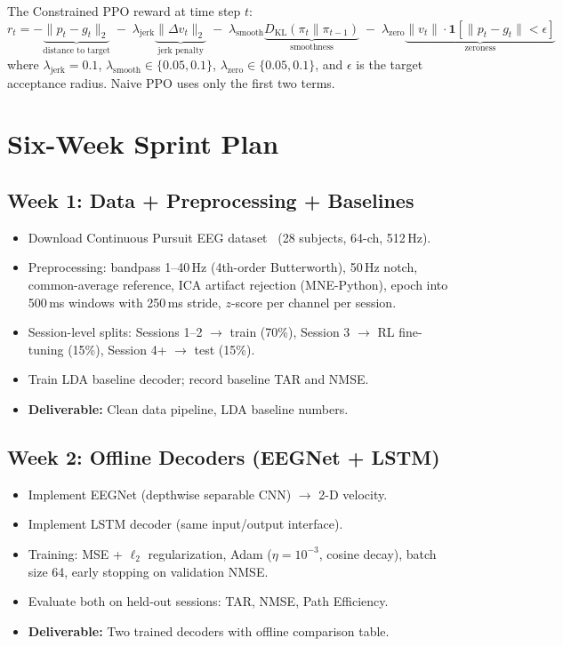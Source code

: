 \documentclass[11pt]{article}
\begin{document}
The Constrained PPO reward at time step $t$:
\begin{equation}
r_t = -\underbrace{\|p_t - g_t\|_2}_{\text{distance to target}}
      \;-\; \lambda_{\text{jerk}}\underbrace{\|\Delta v_t\|_2}_{\text{jerk penalty}}
      \;-\; \lambda_{\text{smooth}}\underbrace{D_{\mathrm{KL}}(\pi_t \| \pi_{t-1})}_{\text{smoothness}}
      \;-\; \lambda_{\text{zero}}\underbrace{\|v_t\| \cdot \mathbf{1}[\|p_t - g_t\| < \epsilon]}_{\text{zeroness}}
\end{equation}
where $\lambda_{\text{jerk}}=0.1$, $\lambda_{\text{smooth}}\in\{0.05,0.1\}$, $\lambda_{\text{zero}}\in\{0.05,0.1\}$, and $\epsilon$ is the target acceptance radius.
Naive PPO uses only the first two terms.

\section{Six-Week Sprint Plan}

\subsection*{Week 1: Data + Preprocessing + Baselines}
\begin{itemize}[leftmargin=*,nosep]
    \item Download Continuous Pursuit EEG dataset~\cite{korik2024} (28 subjects, 64-ch, 512\,Hz).
    \item Preprocessing: bandpass 1--40\,Hz (4th-order Butterworth), 50\,Hz notch, common-average reference, ICA artifact rejection (MNE-Python), epoch into 500\,ms windows with 250\,ms stride, $z$-score per channel per session.
    \item Session-level splits: Sessions 1--2 $\to$ train (70\%), Session 3 $\to$ RL fine-tuning (15\%), Session 4+ $\to$ test (15\%).
    \item Train LDA baseline decoder; record baseline TAR and NMSE.
    \item \textbf{Deliverable:} Clean data pipeline, LDA baseline numbers.
\end{itemize}

\subsection*{Week 2: Offline Decoders (EEGNet + LSTM)}
\begin{itemize}[leftmargin=*,nosep]
    \item Implement EEGNet (depthwise separable CNN) $\to$ 2-D velocity.
    \item Implement LSTM decoder (same input/output interface).
    \item Training: MSE + $\ell_2$ regularization, Adam ($\eta=10^{-3}$, cosine decay), batch size 64, early stopping on validation NMSE.
    \item Evaluate both on held-out sessions: TAR, NMSE, Path Efficiency.
    \item \textbf{Deliverable:} Two trained decoders with offline comparison table.
\end{itemize}
\end{document}
